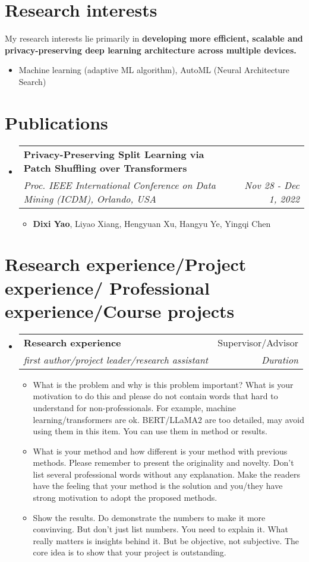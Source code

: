 \documentclass[letterpaper,12pt]{article}
\makeatletter
\newcommand{\resumeItem}[1]{
  \item\small{
    {#1 \vspace{-2pt}}
  }
}
\newcommand{\resumeSubheading}[4]{
  \vspace{-1pt}\item
    \begin{tabular*}{0.97\textwidth}[t]{l@{\extracolsep{\fill}}r}
      \textbf{#1} & #2 \\
      \textit{\small#3} & \textit{\small #4} \\
    \end{tabular*}\vspace{-8pt}
}
\newcommand{\resumeSubHeadingListStart}{\begin{itemize}[leftmargin=0.15in, label={}]}
\newcommand{\resumeSubHeadingListEnd}{\end{itemize}}
\newcommand{\resumeItemListStart}{\begin{itemize}}
\newcommand{\resumeItemListEnd}{\end{itemize}\vspace{-5pt}}
\makeatother
\begin{document}
{\color{DarkBlue}\section {Research interests}}
\justifying My research interests lie primarily in \textbf{developing more efficient, scalable and privacy-preserving deep learning architecture across multiple devices.} 
\resumeItemListStart
\resumeItem{Machine learning (adaptive ML algorithm), AutoML (Neural Architecture Search)}
\resumeItemListEnd

\vspace{-5pt}
{\color{DarkBlue}\section {Publications}}
\resumeSubHeadingListStart
	\resumeSubheading
     {Privacy-Preserving Split Learning via Patch Shuffling over Transformers}
      {}
     {Proc. IEEE International Conference
on Data Mining (ICDM), Orlando, USA}{Nov 28 - Dec 1, 2022}
     \resumeItemListStart
      \resumeItem{\textbf{Dixi Yao}, Liyao Xiang, Hengyuan Xu, Hangyu Ye, Yingqi Chen}
      \resumeItemListEnd
\vspace{-5pt}
\resumeSubHeadingListEnd

{\color{DarkBlue}\section {Research experience/Project experience/ Professional experience/Course projects}}
\resumeSubHeadingListStart
\resumeSubheading
{Research experience}
{Supervisor/Advisor}
{first author/project leader/research assistant
}{Duration}
\resumeItemListStart
\resumeItem{What is the problem and why is this problem important? What is your motivation to do this and please do not contain words that hard to understand for non-professionals. For example, machine learning/transformers are ok. BERT/LLaMA2 are too detailed, may avoid using them in this item. You can use them in method or results.}
\resumeItem{What is your method and how different is your method with previous methods. Please remember to present the originality and novelty. Don't list several professional words without any explanation. Make the readers have the feeling that your method is the solution and you/they have strong motivation to adopt the proposed methods.}
\resumeItem{Show the results. Do demonstrate the numbers to make it more convinving. But don't just list numbers. You need to explain it. What really matters is  insights behind it. But be objective, not subjective. The core idea is to show that your project is outstanding.}
\resumeItemListEnd
\vspace{-5pt}
\resumeSubHeadingListEnd
\end{document}
